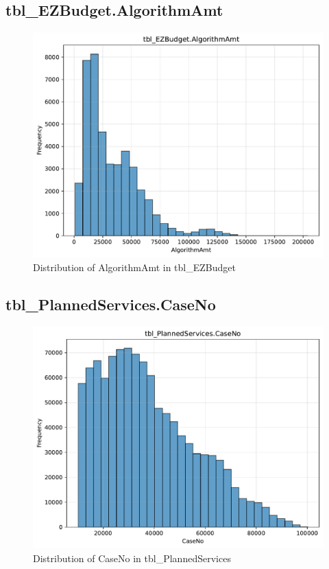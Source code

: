 \subsection{tbl\_EZBudget.AlgorithmAmt}

\begin{figure}[htbp]
\centering
\includegraphics[width=\textwidth]{figures/dbo_tbl_EZBudget_AlgorithmAmt.pdf}
\caption{Distribution of AlgorithmAmt in tbl\_EZBudget}
\end{figure}\newpage

\subsection{tbl\_PlannedServices.CaseNo}

\begin{figure}[htbp]
\centering
\includegraphics[width=\textwidth]{figures/dbo_tbl_PlannedServices_CaseNo.pdf}
\caption{Distribution of CaseNo in tbl\_PlannedServices}
\end{figure}\newpage

